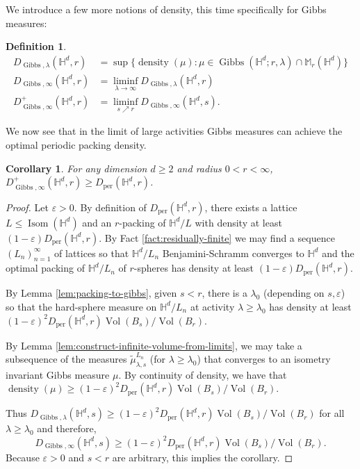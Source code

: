 \documentclass[11pt]{amsart}
\newtheorem{corollary}[theorem]{Corollary}
\theoremstyle{definition}
\newtheorem{definition}[theorem]{Definition}
\theoremstyle{remark}
\renewcommand{\H}{\mathbb{H}}
\newcommand{\M}{\mathbb{M}}
\newcommand{\Isom}{\operatorname{Isom}}
\newcommand{\density}{\operatorname{density}}
\newcommand{\per}{\operatorname{per}}
\newcommand{\vol}{\operatorname{Vol}}
\newcommand{\eps}{\varepsilon}
\newcommand{\Gibbs}{\operatorname{Gibbs}}
\begin{document}
We introduce a few more notions of density, this time specifically for Gibbs measures:


\begin{definition}
\begin{align*}
  D_{\Gibbs,\lambda}(\H^d,r)&=\sup \{\density(\mu):\mu \in \Gibbs(\H^d;r,\lambda) \cap \M_r(\H^d)\}\\
  D_{\Gibbs,\infty}(\H^d,r) &= \liminf_{\lambda \to \infty} D_{\Gibbs,\lambda}(\H^d,r)\\
    D^+_{\Gibbs,\infty}(\H^d,r) &= \liminf_{s \nearrow r} D_{\Gibbs,\infty}(\H^d,s). 
\end{align*}    
\end{definition}

We now see that {in the limit of  large activities} Gibbs measures  can achieve the optimal periodic packing density.

\begin{corollary}\label{C:near-optimal1}
     For any dimension $d\ge 2$ and radius $0<r<\infty$,
    $D^+_{\Gibbs,\infty}(\H^d,r) \ge D_{\per}(\H^d,r)$. 
\end{corollary}
  
\begin{proof}
Let $\eps>0$. By definition of $D_{\per}(\H^d,r)$,  there exists a 
lattice $L \le \Isom(\H^d)$ and an $r$-packing of $\H^d/L$ with density at least $(1-\eps)D_{\per}(\H^d,r)$. By Fact \ref{fact:residually-finite} we may find a sequence $(L_n)_{n = 1}^\infty$ of lattices so that $\H^d / L_n$ Benjamini-Schramm converges to $\H^d$ and the optimal packing of $\H^d/L_n$ of $r$-spheres has density at least $(1-\eps)D_{\per}(\H^d,r).$  

By Lemma \ref{lem:packing-to-gibbs}, given $s<r$, there is a $\lambda_0$ (depending on $s,\eps$) so that the hard-sphere measure on $\H^d/L_n$ at activity $\lambda\ge \lambda_0$ has density at least $(1-\eps)^2D_{\per}(\H^d,r)\vol(B_s)/\vol(B_r)$. 

By Lemma \ref{lem:construct-infinite-volume-from-limits}, we may take a subsequence of the measures $\tilde{\mu}^{L_n}_{\lambda,s}$ (for $\lambda \ge \lambda_0$) that converges to an isometry invariant Gibbs measure $\mu$.  By continuity of density, we have that $\density(\mu) \geq (1 - \eps)^2D_{\per}(\H^d,r)\vol(B_s)/\vol(B_r).$ 

Thus $D_{\Gibbs,\lambda}(\H^d,s) \geq (1 - \eps)^2D_{\per}(\H^d,r)\vol(B_s)/\vol(B_r)$ for all $\lambda \ge \lambda_0$ and therefore, $$D_{\Gibbs,\infty}(\H^d,s) \ge (1 - \eps)^2D_{\per}(\H^d,r)\vol(B_s)/\vol(B_r).$$ Because $\eps>0$ and $s<r$ are arbitrary, this implies the corollary.
\end{proof}
\end{document}
